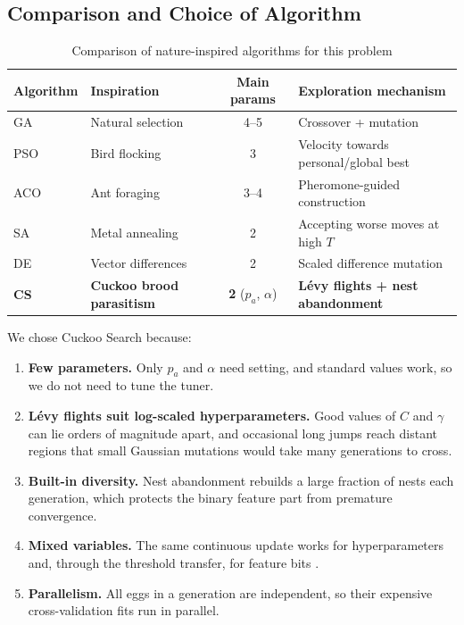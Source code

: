 \documentclass[12pt,a4paper]{article}
\numberwithin{equation}{section}
\numberwithin{table}{section}
\numberwithin{figure}{section}
\begin{document}
\subsection{Comparison and Choice of Algorithm}
\begin{table}[H]
\centering
\caption{Comparison of nature-inspired algorithms for this problem}
\label{tab:nia}
\small
\renewcommand{\arraystretch}{1.2}
\begin{tabularx}{\textwidth}{@{}l>{\raggedright}Xc>{\raggedright\arraybackslash}X@{}}
\toprule
\textbf{Algorithm} & \textbf{Inspiration} & \textbf{Main params} & \textbf{Exploration mechanism} \\ \midrule
GA  & Natural selection & 4--5 & Crossover + mutation \\
PSO & Bird flocking & 3 & Velocity towards personal/global best \\
ACO & Ant foraging & 3--4 & Pheromone-guided construction \\
SA  & Metal annealing & 2 & Accepting worse moves at high $T$ \\
DE  & Vector differences & 2 & Scaled difference mutation \\
\textbf{CS} & \textbf{Cuckoo brood parasitism} & \textbf{2} ($p_a$, $\alpha$) & \textbf{Lévy flights + nest abandonment} \\ \bottomrule
\end{tabularx}
\end{table}

\noindent We chose Cuckoo Search because:
\begin{enumerate}
  \item \textbf{Few parameters.} Only $p_a$ and $\alpha$ need setting, and standard values work, so we do not need to tune the tuner.
  \item \textbf{Lévy flights suit log-scaled hyperparameters.} Good values of $C$ and $\gamma$ can lie orders of magnitude apart, and occasional long jumps reach distant regions that small Gaussian mutations would take many generations to cross.
  \item \textbf{Built-in diversity.} Nest abandonment rebuilds a large fraction of nests each generation, which protects the binary feature part from premature convergence.
  \item \textbf{Mixed variables.} The same continuous update works for hyperparameters and, through the threshold transfer, for feature bits \cite{rodrigues2013}.
  \item \textbf{Parallelism.} All eggs in a generation are independent, so their expensive cross-validation fits run in parallel.
\end{enumerate}
\end{document}
